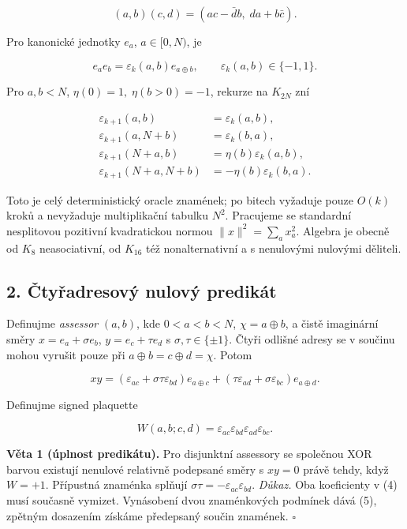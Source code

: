 \documentclass[
  10pt,
]{article}
\begin{document}
\[
(a,b)(c,d)=(ac-\bar d b,\;da+b\bar c).
\tag{1}
\]

Pro kanonické jednotky \(e_a\), \(a\in[0,N)\), je

\[
e_a e_b=\varepsilon_k(a,b)e_{a\oplus b},\qquad \varepsilon_k(a,b)\in\{-1,1\}.
\tag{2}
\]

Pro \(a,b<N\), \(\eta(0)=1,\;\eta(b>0)=-1\), rekurze na \(K_{2N}\) zní

\[
\begin{aligned}
\varepsilon_{k+1}(a,b)&=\varepsilon_k(a,b),\\
\varepsilon_{k+1}(a,N+b)&=\varepsilon_k(b,a),\\
\varepsilon_{k+1}(N+a,b)&=\eta(b)\varepsilon_k(a,b),\\
\varepsilon_{k+1}(N+a,N+b)&=-\eta(b)\varepsilon_k(b,a).
\end{aligned}\tag{3}
\]

Toto je celý deterministický oracle znamének; po bitech vyžaduje pouze
\(O(k)\) kroků a nevyžaduje multiplikační tabulku \(N^2\). Pracujeme se
standardní nesplitovou pozitivní kvadratickou normou
\(\lVert x\rVert^2=\sum_a x_a^2\). Algebra je obecně od \(K_8\)
neasociativní, od \(K_{16}\) též nonalternativní a s nenulovými nulovými
děliteli.

\subsection{2. Čtyřadresový nulový
predikát}\label{ux10dtyux159adresovuxfd-nulovuxfd-predikuxe1t}

Definujme \emph{assessor} \((a,b)\), kde \(0<a<b<N\),
\(\chi=a\oplus b\), a čistě imaginární směry \(x=e_a+\sigma e_b\),
\(y=e_c+\tau e_d\) s \(\sigma,\tau\in\{\pm1\}\). Čtyři odlišné adresy se
v součinu mohou vyrušit pouze při \(a\oplus b=c\oplus d=\chi\). Potom

\[
xy=(\varepsilon_{ac}+\sigma\tau\varepsilon_{bd})e_{a\oplus c}+(\tau\varepsilon_{ad}+\sigma\varepsilon_{bc})e_{a\oplus d}.
\tag{4}
\]

Definujme signed plaquette

\[
W(a,b;c,d)=\varepsilon_{ac}\varepsilon_{bd}\varepsilon_{ad}\varepsilon_{bc}.
\tag{5}
\]

\textbf{Věta 1 (úplnost predikátu).} Pro disjunktní assessory se
společnou XOR barvou existují nenulové relativně podepsané směry s
\(xy=0\) právě tehdy, když \(W=+1\). Přípustná znaménka splňují
\(\sigma\tau=-\varepsilon_{ac}\varepsilon_{bd}\). \emph{Důkaz.} Oba
koeficienty v (4) musí současně vymizet. Vynásobení dvou znaménkových
podmínek dává (5), zpětným dosazením získáme předepsaný součin znamének.
\(\square\)
\end{document}

